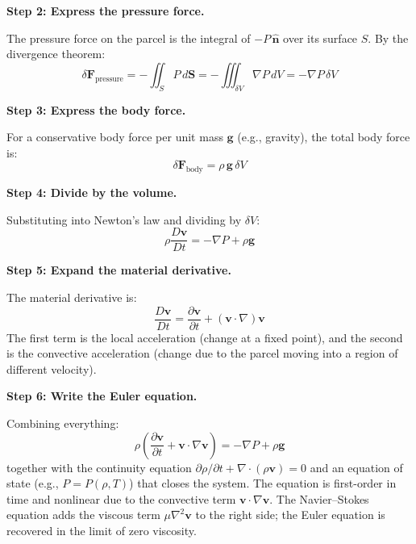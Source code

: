 \textbf{Step 2: Express the pressure force.}

The pressure force on the parcel is the integral of $-P\,\hat{\mathbf{n}}$ over its surface $S$. By the divergence theorem:
\begin{equation}
\delta\mathbf{F}_{\text{pressure}} = -\iint_S P\,d\mathbf{S} = -\iiint_{\delta V}\nabla P\,dV = -\nabla P\,\delta V
\end{equation}

\textbf{Step 3: Express the body force.}

For a conservative body force per unit mass $\mathbf{g}$ (e.g., gravity), the total body force is:
\begin{equation}
\delta\mathbf{F}_{\text{body}} = \rho\,\mathbf{g}\,\delta V
\end{equation}

\textbf{Step 4: Divide by the volume.}

Substituting into Newton's law and dividing by $\delta V$:
\begin{equation}
\rho\frac{D\mathbf{v}}{Dt} = -\nabla P + \rho\mathbf{g}
\end{equation}

\textbf{Step 5: Expand the material derivative.}

The material derivative is:
\begin{equation}
\frac{D\mathbf{v}}{Dt} = \frac{\partial \mathbf{v}}{\partial t} + (\mathbf{v} \cdot \nabla)\mathbf{v}
\end{equation}
The first term is the local acceleration (change at a fixed point), and the second is the convective acceleration (change due to the parcel moving into a region of different velocity).

\textbf{Step 6: Write the Euler equation.}

Combining everything:
\begin{equation}
\boxed{\rho\left(\frac{\partial \mathbf{v}}{\partial t} + \mathbf{v}\cdot\nabla\mathbf{v}\right) = -\nabla P + \rho\mathbf{g}}
\end{equation}
together with the continuity equation $\partial\rho/\partial t + \nabla\cdot(\rho\mathbf{v}) = 0$ and an equation of state (e.g., $P = P(\rho, T)$) that closes the system. The equation is first-order in time and nonlinear due to the convective term $\mathbf{v}\cdot\nabla\mathbf{v}$. The Navier--Stokes equation adds the viscous term $\mu\nabla^2\mathbf{v}$ to the right side; the Euler equation is recovered in the limit of zero viscosity.


